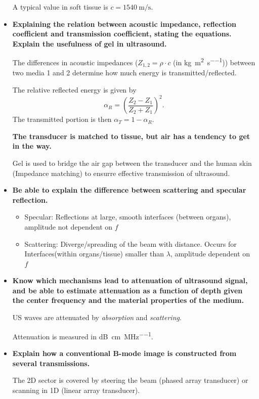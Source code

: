 \documentclass[10pt,a4paper,noendnumber=true]{scrartcl}
\begin{document}
\begin{itemize}
A typical value in soft tissue is $c=\SI{1540}{\m\per\s}$.

\item \textbf{Explaining the relation between acoustic impedance, reflection coefficient and transmission coefficient, stating the equations. Explain the usefulness of gel in ultrasound.}

The differences in acoustic impedances ($Z_{1,2}=\rho \cdot c$ (in \si{\kg\per\m\squared\per\s})) between two media 1 and 2 determine how much energy is transmitted/reflected.

The relative reflected energy is given by
\begin{equation}
\alpha_R = \left(\frac{Z_2-Z_1}{Z_2+Z_1}\right)^2.
\end{equation}
The transmitted portion is then $\alpha_T=1-\alpha_R$.

\textbf{The transducer is matched to tissue, but air has a tendency to get in the way. }

Gel is used to bridge the air gap between the transducer and the human skin (Impedance matching) to ensurre effective transmission of ultrasound. 

\item \textbf{Be able to explain the difference between scattering and specular reflection.}

\begin{itemize}
\item Specular: Reflections at large, smooth interfaces (between organs), amplitude not dependent on $f$
\item Scattering: Diverge/spreading of the beam with distance. Occurs for  Interfaces(within organs/tissue) smaller than $\lambda$, amplitude dependent on $f$
\end{itemize}

\item \textbf{Know which mechanisms lead to attenuation of ultrasound signal, and be able to estimate attenuation as a function of depth given the center frequency and the material properties of the medium.}

US waves are attenuated by \textit{absorption} and \textit{scattering}.

Attenuation is measured in \si{\dB\per\centi\meter\per\MHz}.

\item \textbf{Explain how a conventional B-mode image is constructed from several transmissions.}

The 2D sector is covered by steering the beam (phased array transducer) or scanning in 1D (linear array transducer).


\end{itemize}
\end{document}

